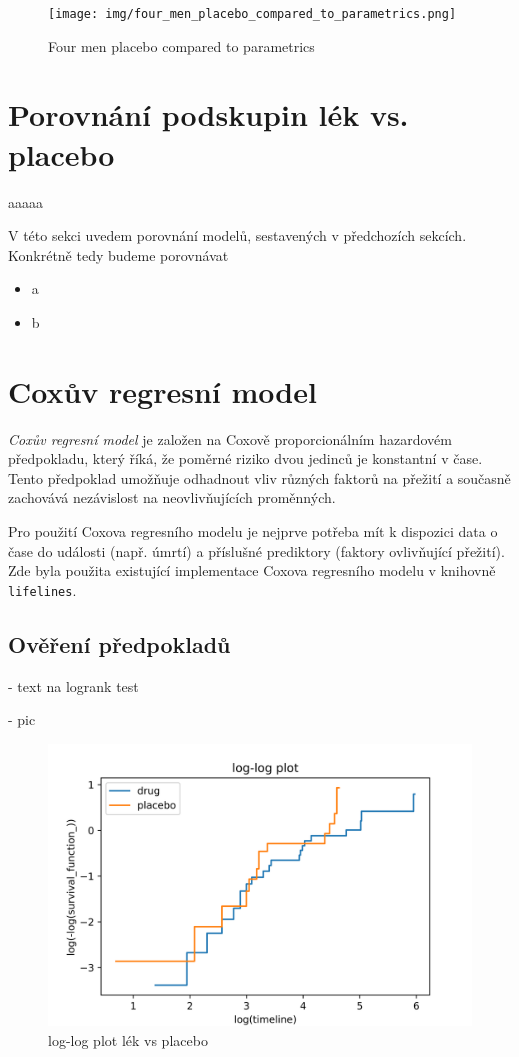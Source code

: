 \documentclass[a4, 11pt]{article}
\theoremstyle{definition}
\theoremstyle{remark}
\begin{document}
	\begin{figure}[H]
	\centering
	\texttt{[image: img/four\_men\_placebo\_compared\_to\_parametrics.png]}
	\caption{Four men placebo compared to parametrics}
	\label{fig:four_men_placebo}
\end{figure}
	
	
	\section{Porovnání podskupin lék vs. placebo} \label{sec:comparison_drug_vs_placebo}
	aaaaa
	
	V této sekci uvedem porovnání modelů, sestavených v předchozích sekcích. Konkrétně tedy budeme porovnávat 
	\begin{itemize}
		\item a
		\item b
	\end{itemize}

	
	
	\newpage
	\section{Coxův regresní model} \label{sec:cox_model}
	\textit{Coxův regresní model} je založen na Coxově proporcionálním hazardovém předpokladu, který říká, že poměrné riziko dvou jedinců je konstantní v čase. Tento předpoklad umožňuje odhadnout vliv různých faktorů na přežití a současně zachovává nezávislost na neovlivňujících proměnných.
	
	Pro použití Coxova regresního modelu je nejprve potřeba mít k dispozici data o čase do události (např. úmrtí) a příslušné prediktory (faktory ovlivňující přežití). Zde byla použita existující implementace Coxova regresního modelu v knihovně \texttt{lifelines}.
	
	\subsection{Ověření předpokladů}
	
	 - text na logrank test
	 
	 - pic
	 
	 \begin{figure}[H]
	 	\centering
	 	\includegraphics[width=0.9\linewidth]{img/loglogplot_KM.png}
	 	\caption{log-log plot lék vs placebo}
	 	\label{fig:loglogplot_drug_vs_placebo}
	 \end{figure}
	
\end{document}
